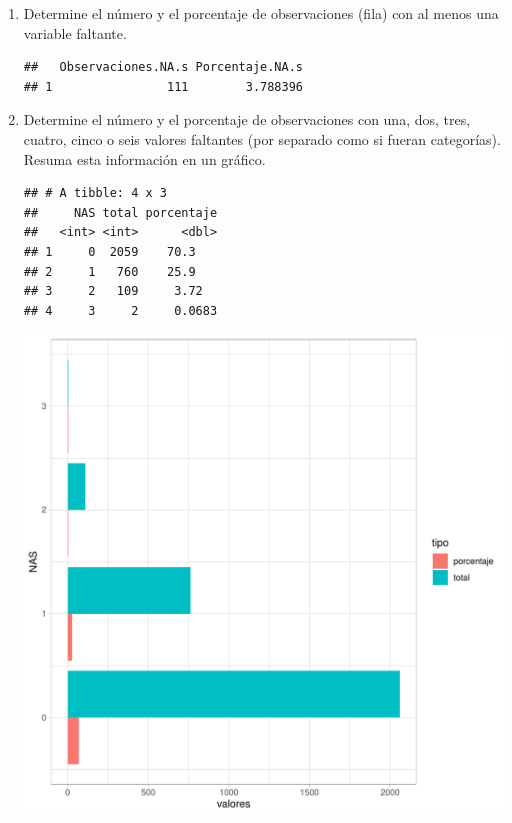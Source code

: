 \documentclass[9pt,letterpaper]{article}\usepackage[]{graphicx}\usepackage[]{color}
\makeatletter
\def\maxwidth{ %
  \ifdim\Gin@nat@width>\linewidth
    \linewidth
  \else
    \Gin@nat@width
  \fi
}
\newenvironment{kframe}{%
 \def\at@end@of@kframe{}%
 \ifinner\ifhmode%
  \def\at@end@of@kframe{\end{minipage}}%
  \begin{minipage}{\columnwidth}%
 \fi\fi%
 \def\FrameCommand##1{\hskip\@totalleftmargin \hskip-\fboxsep
 \colorbox{shadecolor}{##1}\hskip-\fboxsep
     \hskip-\linewidth \hskip-\@totalleftmargin \hskip\columnwidth}%
 \MakeFramed {\advance\hsize-\width
   \@totalleftmargin\z@ \linewidth\hsize
   \@setminipage}}%
 {\par\unskip\endMakeFramed%
 \at@end@of@kframe}
\newenvironment{knitrout}{}{} %
\makeatother
\begin{document}
\begin{enumerate}
\begin{knitrout}
\end{knitrout}
   \item Determine el número y el porcentaje de observaciones (fila) con al menos una variable faltante.
\begin{knitrout}
\color{fgcolor}\begin{kframe}
\begin{verbatim}
##   Observaciones.NA.s Porcentaje.NA.s
## 1                111        3.788396
\end{verbatim}
\end{kframe}
\end{knitrout}
    \item Determine el número y el porcentaje de observaciones con una, dos, tres, cuatro, cinco o seis valores faltantes (por separado como si fueran categorías). Resuma esta información en un gráfico.
\begin{knitrout}
\color{fgcolor}\begin{kframe}
\begin{verbatim}
## # A tibble: 4 x 3
##     NAS total porcentaje
##   <int> <int>      <dbl>
## 1     0  2059    70.3   
## 2     1   760    25.9   
## 3     2   109     3.72  
## 4     3     2     0.0683
\end{verbatim}
\end{kframe}
\includegraphics[width=\maxwidth]{figure/unnamed-chunk-6-1} 


\end{knitrout}
\end{enumerate}
\end{document}
